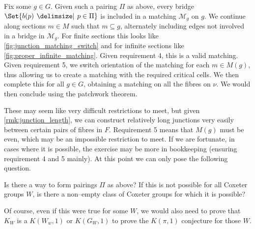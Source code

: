 \documentclass[class=article, crop=false]{standalone}
\begin{document}
Fix some $g \in G$. Given such a pairing $\Pi$ as above, every bridge $\Set{b(p) \given p \in \Pi}$ is included in a matching $\mathcal{M}_g$ on $g$. We continue along sections $m \in M$ such that $m \subseteq g$, alternately including edges not involved in a bridge in $\mathcal{M}_g$. For finite sections this looks like \cref{fig:junction_matching_switch} and for infinite sections like \cref{fig:proper_infinite_matching}. Given requirement 4, this is a valid matching. Given requirement 5, we switch orientation of the matching for each $m \in M(g)$, thus allowing us to create a matching with the required critical cells. We then complete this for all $g \in G$, obtaining a matching on all the fibres on $\nu$. We would then conclude using the patchwork theorem.

These may seem like very difficult restrictions to meet, but given \cref{rmk:junction_length}, we can construct relatively long junctions very easily between certain pairs of fibres in $F$. Requirement 5 means that $M(g)$ must be even, which may be an impossible restriction to meet. If we are fortunate, in cases where it is possible, the exercise may be more in bookkeeping (ensuring requirement 4 and 5 mainly). At this point we can only pose the following question.

\begin{question}
    Is there a way to form pairings $\Pi$ as above? If this is not possible for all Coxeter groups $W$, is there a non--empty class of Coxeter groups for which it is possible?
\end{question}

Of course, even if this were true for some $W$, we would also need to prove that $K_W$ is a $K(W_w,1)$ or $K(G_W,1)$ to prove the $K(\pi,1)$ conjecture for those $W$.
\end{document}
